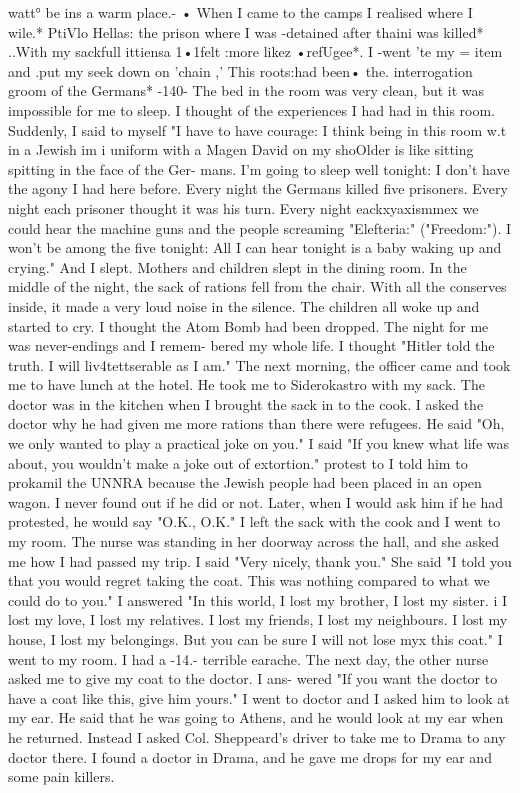 watt° be ins a warm place.- • When I came to the camps I realised where I wile.* PtiVlo 
Hellas: the prison where I was -detained after thaini was killed* ..With my sackfull 
ittiensa 1•1felt :more likez •refUgee*. I -went 'te my = item and .put my seek down on 
'chain ,' This roots:had been• the. interrogation groom of the Germans* 
-140- 
The bed in the room was very clean, but it was impossible for me to sleep. 
I thought of the experiences I had had in this room. Suddenly, I said to myself 
"I have to have courage: I think being in this room w.t in a Jewish im i uniform 
with a Magen David on my shoOlder is like sitting spitting in the face of the Ger-
mans. I'm going to sleep well tonight: I don't have the agony I had here before. 
Every night the Germans killed five prisoners. Every night each prisoner thought it 
was his turn. Every night eackxyaxismmex we could hear the machine guns and the people 
screaming "Elefteria:" ("Freedom:"). I won't be among the five tonight: All I can 
hear tonight is a baby waking up and crying." And I slept. 
Mothers and children slept in the dining room. In the middle of the night, the 
sack of rations fell from the chair. With all the conserves inside, it made a very 
loud noise in the silence. The children all woke up and started to cry. I thought 
the Atom Bomb had been dropped. The night for me was never-endings and I remem-
bered my whole life. I thought "Hitler told the truth. I will liv4tettserable 
as I am." 
The next morning, the officer came and took me to have lunch at the hotel. He 
took me to Siderokastro with my sack. The doctor was in the kitchen when I brought 
the sack in to the cook. I asked the doctor why he had given me more rations than 
there were refugees. He said "Oh, we only wanted to play a practical joke on you." 
I said "If you knew what life was about, you wouldn't make a joke out of extortion." 
protest to 
I told him to prokamil the UNNRA because the Jewish people had been placed in an open 
wagon. I never found out if he did or not. Later, when I would ask him if he had 
protested, he would say "O.K., O.K." 
I left the sack with the cook and I went to my room. The nurse was standing 
in her doorway across the hall, and she asked me how I had passed my trip. I said 
"Very nicely, thank you." She said "I told you that you would regret taking the 
coat. This was nothing compared to what we could do to you." I answered "In this 
world, I lost my brother, I lost my sister. i I lost my love, I lost my relatives. 
I lost my friends, I lost my neighbours. I lost my house, I lost my belongings. 
But you can be sure I will not lose myx this coat." I went to my room. I had a 
-14.- 
terrible earache. 
The next day, the other nurse asked me to give my coat to the doctor. I ans-
wered "If you want the doctor to have a coat like this, give him yours." I went to 
doctor and I asked him to look at my ear. He said that he was going to Athens, and 
he would look at my ear when he returned. Instead I asked Col. Sheppeard's driver 
to take me to Drama to any doctor there. I found a doctor in Drama, and he gave me 
drops for my ear and some pain killers. 

